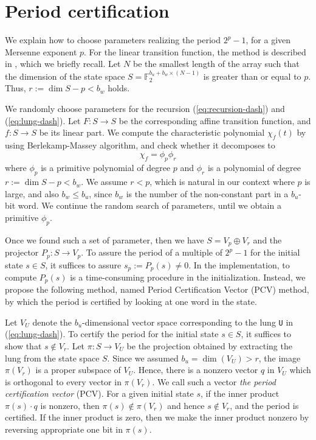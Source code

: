 \documentclass{svmult}
\begin{document}
\section{Period certification}
\label{sec:PCV}
We explain how to choose parameters 
realizing the period $2^p-1$, for a given
Mersenne exponent $p$.
For the linear transition function, the method is 
described in \cite{SFMT}, which we briefly 
recall.
Let 
$N$ be the smallest length of the array such that
the dimension of the state space 
$S={\mathbb F}_2^{b_u + b_w \times (N-1)}$
is greater than or equal to $p$. Thus, 
$r:=\dim S - p < b_w$ holds.

We randomly choose parameters for the recursion 
(\ref{eq:recursion-dash}) and
(\ref{eq:lung-dash}). Let $F:S \to S$ be the 
corresponding affine transition function, and $f:S \to S$ be
its linear part. We compute the characteristic
polynomial $\chi_f(t)$ by using Berlekamp-Massey algorithm, and
check whether it decomposes to 
\[
\chi_f=\phi_p \phi_r
\]
where $\phi_p$ is a primitive polynomial of degree $p$
and $\phi_r$ is a polynomial of degree %
$r:=\dim S -p < b_w$. We assume $r<p$, which is natural
in our context where $p$ is large, and also $b_w\leq b_u$,
since $b_w$ is the number of the non-constant part in 
a $b_u$-bit word.
We continue the random search of parameters, 
until we obtain a primitive $\phi_p$.

Once we found such a set of parameter, then we have
$S=V_p \oplus V_r$ and the projector $P_p: S \to V_p$.
To assure the period of a multiple of $2^p-1$ for the initial state $s \in S$,
it suffices to assure $s_p:=P_p (s) \neq 0$. 
In the implementation, to compute $P_p(s)$ is a time-consuming
procedure in the initialization. Instead, we propose the 
following method, named Period Certification Vector (PCV) method,
by which the period is certified by looking at one word in the state.

Let $V_U$ denote the $b_u$-dimensional vector space corresponding to the lung 
\texttt{U} in (\ref{eq:lung-dash}). To certify the period for
the initial state $s \in S$, it suffices to show that
$s \notin V_r$. Let $\pi:S \to V_U$ be the projection obtained
by extracting the lung from the state space $S$. Since we assumed
$b_u=\dim (V_U)>r$, the image $\pi (V_r)$ is a proper subspace of $V_U$.
Hence, there is a nonzero vector $q$ in $V_U$ which is orthogonal
to every vector in $\pi (V_r)$. We call such a vector {\em the period certification vector} (PCV).
For a given initial state $s$, if the inner product $\pi(s)\cdot q$ is nonzero,
then $\pi(s) \notin \pi(V_r)$ and hence $s \notin V_r$, and the period is certified. If
the inner product is zero, then we make the inner product nonzero by reversing 
appropriate one bit in $\pi(s)$.
\end{document}
